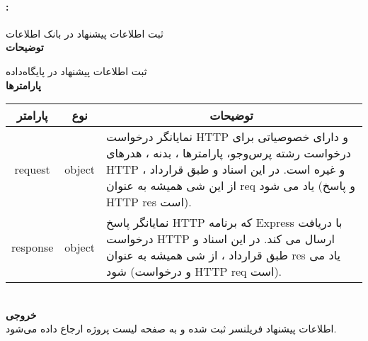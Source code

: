 \paragraph{:}
ثبت اطلاعات پیشنهاد در بانک اطلاعات
\\
\textbf{توضیحات}
\hr
\begin{flushleft}
	\framebox[.9\textwidth][l]{
		\lr{
			\textcolor{type}{void}
			\textcolor{func}{postAddRequest}
			\textcolor{symb}{(}
			\textcolor{type}{object}
			\textcolor{arg}{request}
			\textcolor{symb}{,}
			\textcolor{type}{object}
			\textcolor{arg}{response}
			\textcolor{symb}{);}
		}
	}
\end{flushleft}
ثبت اطلاعات پیشنهاد در پایگاه‌داده
\\
\textbf{پارامترها}
\hr \\[10pt]
\begin{tabular}{|m{4cm}|m{3cm}|m{10cm}|}
	\hline
	\multicolumn{1}{|c}{پارامتر}
	&
	\multicolumn{1}{|c}{نوع}
	&
	\multicolumn{1}{|c|}{توضیحات}
	\\
	\hline
	\multicolumn{1}{|c}{request}
	&
	\multicolumn{1}{|c|}{object}
	&
	نمایانگر درخواست HTTP و دارای خصوصیاتی برای درخواست رشته پرس‌و‌جو، پارامترها ، بدنه ، هدرهای HTTP و غیره است.
	در این اسناد و طبق قرارداد ، از این شی همیشه به عنوان req یاد می شود (و پاسخ HTTP res است).
	\\
	\hline
	\multicolumn{1}{|c}{response}
	&
	\multicolumn{1}{|c|}{object}
	&
	نمایانگر پاسخ HTTP که برنامه Express با دریافت درخواست HTTP ارسال می کند.
	در این اسناد و طبق قرارداد ، از شی همیشه به عنوان res یاد می شود (و درخواست HTTP req است).
	\\
	\hline
\end{tabular}
\\[10pt]
\textbf{خروجی}
\hr \\
اطلاعات پیشنهاد فریلنسر ثبت شده و به صفحه لیست پروژه‌ ارجاع داده می‌شود.

